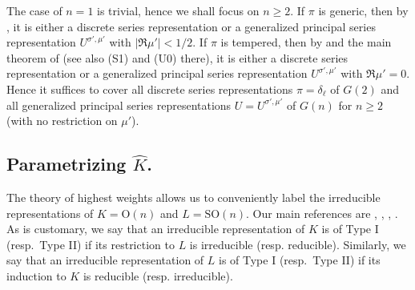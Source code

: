 \documentclass[11pt,oneside]{amsart}
\numberwithin{equation}{section}
\theoremstyle{remark}
\theoremstyle{plain}
\newcommand\OO{\mathrm{O}}
\newcommand\SO{\mathrm{SO}}
\renewcommand\geq{\geqslant}
\begin{document}
The case of $n=1$ is trivial, hence we shall focus on $n\geq 2$. If $\pi$ is generic, then by \cite[Th.~14.10.20]{GH}, it is either a discrete series representation or a generalized principal series representation $U^{\sigma',\mu'}$ with $|\Re\mu'|<1/2$. If $\pi$ is tempered, then by \cite[Cor.~6.2]{Trombi} and the main theorem of \cite{Tadic} (see also (S1) and (U0) there), it is either a discrete series representation or a generalized principal series representation $U^{\sigma',\mu'}$ with $\Re\mu'=0$. Hence it suffices to cover all discrete series representations $\pi=\delta_\ell$ of $G(2)$ and all generalized principal series representations $U=U^{\sigma',\mu'}$ of $G(n)$ for $n\geq 2$ (with no restriction on $\mu'$).

\subsection{Parametrizing $\widehat{K}$.}\label{parametrizingK}
The theory of highest weights allows us to conveniently label the irreducible representations of $K=\OO(n)$ and $L=\SO(n)$. Our main references are \cite[\S114]{Zh}, \cite[Ch.~VII]{Bo}, \cite[Ch.~VI, \S7]{BD}, \cite[\S5.5.5]{GW}. As is customary, we say that an irreducible representation of $K$ is of Type I (resp.\ Type II) if its restriction to $L$ is irreducible (resp. reducible). Similarly, we say that an irreducible representation of $L$ is of Type I (resp.\ Type II) if its induction to $K$ is reducible (resp. irreducible).
\end{document}
